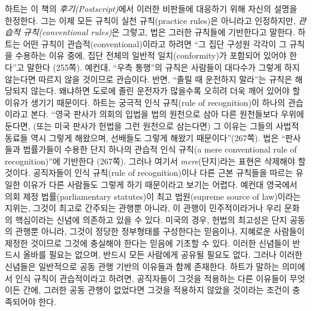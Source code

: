 \documentclass[12pt, oneside]{book}  %
\begin{document}
하트는 이 책의 \emph{후기(Postscript)}에서 이러한 비판들에 대응하기 위해
자신의 설명을 한정한다. 그는 이제 모든 규칙이 실천 규칙(practice
rules)은 아니라고 인정하지만, \emph{관습적 규칙(conventional rules)}은
그렇고, 법은 그러한 규칙들에 기반한다고 말한다. 하트는 어떤 규칙이
관습적(conventional)이라고 하려면 ``그 집단 구성원 각각이 그 규칙을
수용하는 이유 중에, 집단 전체의 일반적 일치(conformity)가 포함되어
있어야 한다''고 말한다 (255쪽). 예컨대, ``우측 통행''의 규칙은 사람들이
대다수가 그렇게 하지 않는다면 따르지 않을 것이므로 관습이다. 반면,
``졸릴 때 운전하지 말라''는 규칙은 해당되지 않는다. 왜냐하면 도로에 졸린
운전자가 많을수록 오히려 더욱 깨어 있어야 할 이유가 생기기 때문이다.
하트는 궁극적 인식 규칙(rule of recognition)이 하나의 관습이라고 본다.
``영국 판사가 의회의 입법을 법의 원천으로 삼아 다른 원천들보다 우위에
둔다면, (또는 미국 판사가 헌법을 그런 원천으로 삼는다면) 그 이유는
그들의 사법적 동료들 역시 그렇게 해왔으며, 선배들도 그렇게 해왔기
때문이다''(267쪽). 법은 ``판사들과 법률가들이 수용한 단지 하나의 관습적
인식 규칙(a mere conventional rule of recognition)''에 기반한다 (267쪽).
그러나 여기서 \emph{mere}(단지)라는 표현은 삭제해야 할 것이다.
공직자들이 인식 규칙(rule of recognition)이나 다른 근본 규칙들을 따르는
유일한 이유가 다른 사람들도 그렇게 하기 때문이라고 보기는 어렵다. 예컨대
영국에서 의회 제정 법률(parliamentary statutes)이 최고 법원(supreme
source of law)이라는 지위는, 그것이 최고로 간주되는 관행뿐 아니라, 이
관행이 민주적이라거나 우리 문화의 핵심이라는 신념에 의존하고 있을 수
있다. 미국의 경우, 헌법의 최고성은 단지 공동의 관행뿐 아니라, 그것이
정당한 정부형태를 구성한다는 믿음이나, 지혜로운 사람들이 제정한 것이므로
그것에 충실해야 한다는 믿음에 기초할 수 있다. 이러한 신념들이 반드시
올바를 필요는 없으며, 반드시 모든 사람에게 공유될 필요도 없다. 그러나
이러한 신념들은 일반적으로 공동 관행 기반의 이유들과 함께 존재한다.
하트가 말하는 의미에서 인식 규칙이 관습적이라고 하려면, 공직자들이
그것을 적용하는 다른 이유들이 무엇이든 간에, 그러한 공동 관행이 없었다면
그것을 적용하지 않았을 것이라는 조건이 충족되어야 한다.
\end{document}

